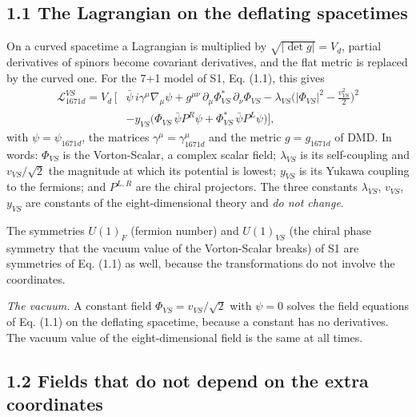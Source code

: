 \documentclass[
  10pt,
]{article}
\begin{document}
\hypertarget{the-lagrangian-on-the-deflating-spacetimes}{%
\subsection{1.1 The Lagrangian on the deflating
spacetimes}\label{the-lagrangian-on-the-deflating-spacetimes}}

On a curved spacetime a Lagrangian is multiplied by
\(\sqrt{\lvert\det g\rvert}=V_d\), partial derivatives of spinors become
covariant derivatives, and the flat metric is replaced by the curved
one. For the 7+1 model of S1, Eq. (1.1), this gives
\[\begin{aligned}\mathcal L_{1671d}^{VS}=V_d\,\Big[&\bar\psi\,i\gamma^\mu\nabla_\mu\psi
+g^{\mu\nu}\,\partial_\mu\Phi_{VS}^{*}\,\partial_\nu\Phi_{VS}
-\lambda_{VS}\Big(\lvert\Phi_{VS}\rvert^2-\frac{v_{VS}^2}{2}\Big)^{2}\\
&-y_{VS}\big(\Phi_{VS}\,\bar\psi P^{R}\psi+\Phi_{VS}^{*}\,\bar\psi P^{L}\psi\big)\Big],\end{aligned}\tag{1.1}\]
with \(\psi=\psi_{1671d}\), the matrices
\(\gamma^\mu=\gamma^\mu_{1671d}\) and the metric \(g=g_{1671d}\) of DMD.
In words: \(\Phi_{VS}\) is the Vorton-Scalar, a complex scalar field;
\(\lambda_{VS}\) is its self-coupling and \(v_{VS}/\sqrt2\) the
magnitude at which its potential is lowest; \(y_{VS}\) is its Yukawa
coupling to the fermions; and \(P^{L,R}\) are the chiral projectors. The
three constants \(\lambda_{VS}\), \(v_{VS}\), \(y_{VS}\) are constants
of the eight-dimensional theory and \emph{do not change}.

The symmetries \(U(1)_F\) (fermion number) and \(U(1)_{VS}\) (the chiral
phase symmetry that the vacuum value of the Vorton-Scalar breaks) of S1
are symmetries of Eq. (1.1) as well, because the transformations do not
involve the coordinates.

\emph{The vacuum.} A constant field \(\Phi_{VS}=v_{VS}/\sqrt2\) with
\(\psi=0\) solves the field equations of Eq. (1.1) on the deflating
spacetime, because a constant has no derivatives. The vacuum value of
the eight-dimensional field is the same at all times.

\hypertarget{fields-that-do-not-depend-on-the-extra-coordinates}{%
\subsection{1.2 Fields that do not depend on the extra
coordinates}\label{fields-that-do-not-depend-on-the-extra-coordinates}}
\end{document}

